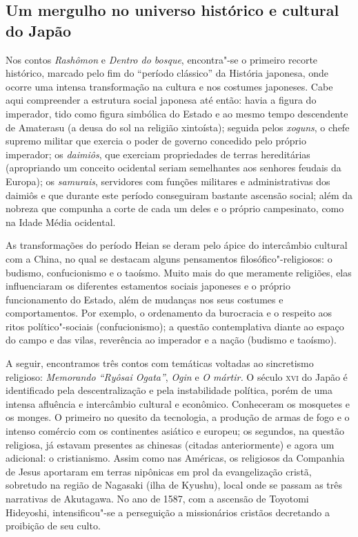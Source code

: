 \documentclass[12pt]{extarticle}
\begin{document}


\subsection{Um mergulho no universo histórico e cultural do Japão}

Nos contos \emph{Rashômon} e \emph{Dentro do bosque}, encontra"-se o primeiro
recorte histórico, marcado pelo fim do ``período clássico'' da História
japonesa, onde ocorre uma intensa transformação na cultura e nos costumes
japoneses. Cabe aqui compreender a estrutura social japonesa até então: havia a
figura do imperador, tido como figura simbólica do Estado e ao mesmo tempo
descendente de Amaterasu (a deusa do sol na religião xintoísta); seguida pelos
\emph{xoguns}, o chefe supremo militar que exercia o poder de governo concedido
pelo próprio imperador; os \emph{daimiôs}, que exerciam propriedades de terras
hereditárias (apropriando um conceito ocidental seriam semelhantes aos senhores
feudais da Europa); os \emph{samurais}, servidores com funções militares e
administrativas dos daimiôs e que durante este período conseguiram bastante
ascensão social; além da nobreza que compunha a corte de cada um deles e o
próprio campesinato, como na Idade Média ocidental.

As transformações do período Heian se deram pelo ápice do intercâmbio cultural
com a China, no qual se destacam alguns pensamentos filosófico"-religiosos: o
budismo, confucionismo e o taoísmo. Muito mais do que meramente religiões, elas
influenciaram os diferentes estamentos sociais japoneses e o próprio
funcionamento do Estado, além de mudanças nos seus costumes e comportamentos.
Por exemplo, o ordenamento da burocracia e o respeito aos ritos
político"-sociais (confucionismo); a questão contemplativa diante ao espaço do
campo e das vilas, reverência ao imperador e a nação (budismo e taoísmo).

A seguir, encontramos três contos com temáticas voltadas ao sincretismo
religioso: \emph{Memorando ``Ryôsai Ogata''}, \emph{Ogin} e \emph{O mártir.} O
século \textsc{xvi} do Japão é identificado pela descentralização e pela
instabilidade política, porém de uma intensa afluência e intercâmbio cultural e
econômico. Conheceram os mosquetes e os monges. O primeiro no quesito da
tecnologia, a produção de armas de fogo e o intenso comércio com os continentes
asiático e europeu; os segundos, na questão religiosa, já estavam presentes as
chinesas (citadas anteriormente) e agora um adicional: o cristianismo. Assim
como nas Américas, os religiosos da Companhia de Jesus aportaram em terras
nipônicas em prol da evangelização cristã, sobretudo na região de Nagasaki
(ilha de Kyushu), local onde se passam as três narrativas de Akutagawa. No ano
de 1587, com a ascensão de Toyotomi Hideyoshi, intensificou"-se a perseguição a
missionários cristãos decretando a proibição de seu culto.
\end{document}
